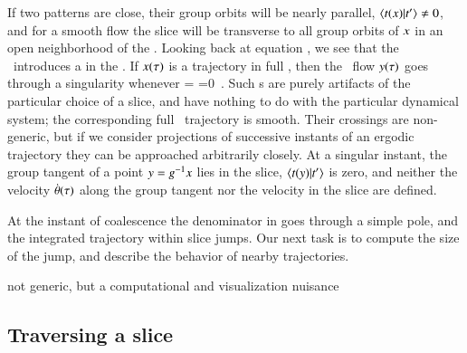 

If  two patterns are close, their group orbits will be nearly parallel,
$\braket{\groupTan(\ssp)}{\sliceTan{}} \neq 0$, and for a smooth flow the
slice will be transverse to all group orbits of $x$ in an open
neighborhood of the {\template} \slicep.
Looking back at equation , we see that the \mslices\
introduces a {\sset} in the \reducedsp. If
$x(\tau)$ is a trajectory in full {\statesp}, then the \reducedsp\
flow $y(\tau)$ goes through a singularity whenever
\beq
\braket{\groupTan(\sspRSing)}{\sliceTan{}}
 =
\braket{\sspRSing}{\Lg^2\slicep}
 =0
\,.
Such {\sset s} are purely artifacts of the particular choice of a slice,
and have nothing to do with the particular dynamical system; the
corresponding full \statesp\ trajectory is smooth. Their crossings are
non-generic, but if we consider projections of successive instants of an
ergodic trajectory they can be approached arbitrarily closely. At a
singular instant, the group tangent of a point $y=g^{-1} x$
lies in the slice, $\braket{\groupTan(\sspRed)}{\sliceTan{}}$ is zero,
and neither the velocity $\dot{{\bf \theta}}(\tau)$ along the group tangent
nor the velocity in the slice are defined.

At the instant of
coalescence the denominator in  goes through a simple
pole, and the integrated trajectory within slice jumps. Our next task is
to compute the size of the jump, and describe the behavior of nearby
trajectories.

not generic, but a computational and visualization nuisance

\subsection{Traversing a slice {\sset}}
\label{sec:sliceSing}



